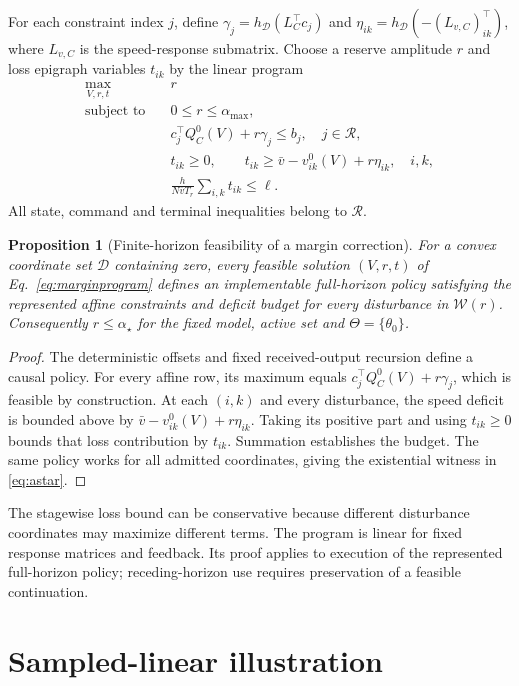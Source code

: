 \documentclass[11pt]{article}
\newtheorem{proposition}[theorem]{Proposition}
\newcommand{\astar}{\alpha_\star}
\begin{document}
For each constraint index $j$, define $\gamma_j=h_{\mathcal D}(L_C^\top c_j)$ and $\eta_{ik}=h_{\mathcal D}(-(L_{v,C})_{ik}^\top)$, where $L_{v,C}$ is the speed-response submatrix. Choose a reserve amplitude $r$ and loss epigraph variables $t_{ik}$ by the linear program
\begin{align}
\max_{V,r,t}\quad & r \nonumber\\
\text{subject to}\quad &0\leq r\leq\alpha_{\max}, \nonumber\\
&c_j^\top Q_C^0(V)+r\gamma_j\leq b_j,\quad j\in\mathcal R, \nonumber\\
&t_{ik}\geq0,\qquad t_{ik}\geq\bar v-v^0_{ik}(V)+r\eta_{ik},\quad i,k,\nonumber\\
&\frac{h}{N\bar vT_r}\sum_{i,k}t_{ik}\leq\ell.
\label{eq:marginprogram}
\end{align}
All state, command and terminal inequalities belong to $\mathcal R$.


\begin{proposition}[Finite-horizon feasibility of a margin correction]\label{prop:design}
For a convex coordinate set $\mathcal D$ containing zero, every feasible solution $(V,r,t)$ of Eq.~\eqref{eq:marginprogram} defines an implementable full-horizon policy satisfying the represented affine constraints and deficit budget for every disturbance in $\mathcal W(r)$. Consequently $r\leq\astar$ for the fixed model, active set and $\Theta=\{\theta_0\}$.
\end{proposition}
\begin{proof}
The deterministic offsets and fixed received-output recursion define a causal policy. For every affine row, its maximum equals $c_j^\top Q_C^0(V)+r\gamma_j$, which is feasible by construction. At each $(i,k)$ and every disturbance, the speed deficit is bounded above by $\bar v-v^0_{ik}(V)+r\eta_{ik}$. Taking its positive part and using $t_{ik}\geq0$ bounds that loss contribution by $t_{ik}$. Summation establishes the budget. The same policy works for all admitted coordinates, giving the existential witness in \eqref{eq:astar}.
\end{proof}

The stagewise loss bound can be conservative because different disturbance coordinates may maximize different terms. The program is linear for fixed response matrices and feedback. Its proof applies to execution of the represented full-horizon policy; receding-horizon use requires preservation of a feasible continuation.

\section{Sampled-linear illustration}\label{sec:linear}
\end{document}
